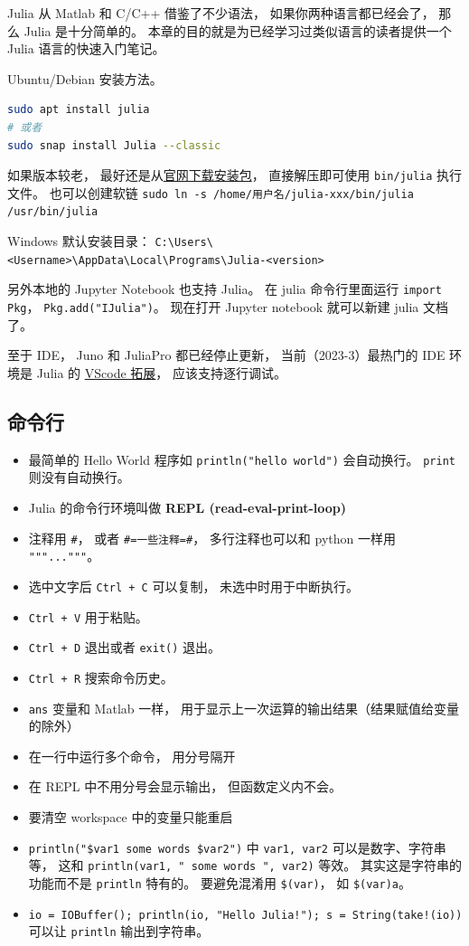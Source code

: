 
Julia 从 Matlab 和 C/C++ 借鉴了不少语法， 如果你两种语言都已经会了， 那么 Julia 是十分简单的。 本章的目的就是为已经学习过类似语言的读者提供一个 Julia 语言的快速入门笔记。

Ubuntu/Debian 安装方法。
\begin{lstlisting}[language=bash]
sudo apt install julia
# 或者
sudo snap install Julia --classic
\end{lstlisting}
如果版本较老， 最好还是从\href{https://julialang.org/downloads}{官网下载安装包}， 直接解压即可使用 \verb`bin/julia` 执行文件。 也可以创建软链 \verb`sudo ln -s /home/用户名/julia-xxx/bin/julia /usr/bin/julia`

Windows 默认安装目录： \verb`C:\Users\<Username>\AppData\Local\Programs\Julia-<version>`

另外本地的 Jupyter Notebook 也支持 Julia。 在 julia 命令行里面运行 \verb`import Pkg`， \verb`Pkg.add("IJulia")`。 现在打开 Jupyter notebook 就可以新建 julia 文档了。

至于 IDE， Juno 和 JuliaPro 都已经停止更新， 当前（2023-3）最热门的 IDE 环境是 Julia 的 \href{https://www.julia-vscode.org}{VScode 拓展}， 应该支持逐行调试。

\subsection{命令行}
\begin{itemize}
\item 最简单的 Hello World 程序如 \verb`println("hello world")` 会自动换行。 \verb`print` 则没有自动换行。
\item Julia 的命令行环境叫做 \textbf{REPL (read-eval-print-loop)}
\item 注释用 \verb`#`， 或者 \verb`#=一些注释=#`， 多行注释也可以和 python 一样用 \verb`"""..."""`。
\item 选中文字后 \verb`Ctrl + C` 可以复制， 未选中时用于中断执行。
\item \verb`Ctrl + V` 用于粘贴。
\item \verb`Ctrl + D` 退出或者 \verb`exit()` 退出。
\item \verb`Ctrl + R` 搜索命令历史。
\item \verb`ans` 变量和 Matlab 一样， 用于显示上一次运算的输出结果（结果赋值给变量的除外）
\item 在一行中运行多个命令， 用分号隔开
\item 在 REPL 中不用分号会显示输出， 但函数定义内不会。
\item 要清空 workspace 中的变量只能重启
\item \verb`println("$var1 some words $var2")` 中 \verb`var1, var2` 可以是数字、字符串等， 这和 \verb`println(var1, " some words ", var2)` 等效。 其实这是字符串的功能而不是 \verb`println` 特有的。 要避免混淆用 \verb`$(var)`， 如 \verb`$(var)a`。
\item \verb`io = IOBuffer(); println(io, "Hello Julia!"); s = String(take!(io))` 可以让 \verb`println` 输出到字符串。
\end{itemize}

